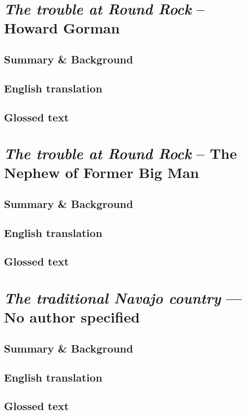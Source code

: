 \documentclass[output=book,
		  ]{langscibook}
\begin{document}
    \chapter{\textit{The trouble at Round Rock} – Howard Gorman}\label{chapter:text02}
    \setcounter{equation}{0}
        \tocless\section{Summary \& Background}
            
        \tocless\section{English translation}
             
        \tocless\section{Glossed text}
            
        \newpage
    \chapter{\textit{The trouble at Round Rock} – The Nephew of Former Big
Man}\label{chapter:text03}
    \setcounter{equation}{0}
        \tocless\section{Summary \& Background}
            
        \tocless\section{English translation}
             
           \tocless\section{Glossed text}
            
        \newpage
    \chapter{\textit{The traditional Navajo country} — No author specified}\label{chapter:text04}
    \setcounter{equation}{0}
        \tocless\section{Summary \& Background}
            
        \tocless\section{English translation}
             
           \tocless\section{Glossed text}
            
        \newpage
\end{document}
